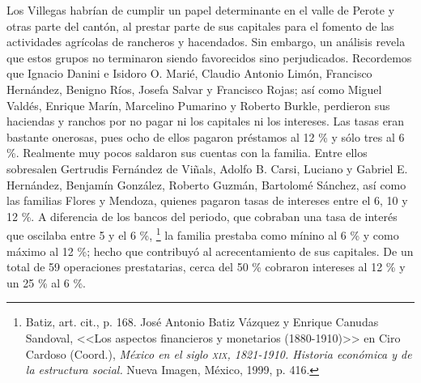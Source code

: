 \documentclass[14pt,twoside,final]{extbook} %
\let\oldfootnote\footnote
\renewcommand\footnote[1]{%
\oldfootnote{\hspace{1mm}#1}}
\begin{document}
Los Villegas habrían de cumplir un papel determinante en el valle de Perote y otras parte del cantón, al prestar parte de sus capitales para el fomento de las actividades agrícolas de rancheros y hacendados. Sin embargo, un análisis revela que estos grupos no terminaron siendo favorecidos sino perjudicados. Recordemos que Ignacio Danini e Isidoro O. Marié, Claudio Antonio Limón, Francisco Hernández, Benigno Ríos, Josefa Salvar y Francisco Rojas; así como Miguel Valdés, Enrique Marín, Marcelino Pumarino y Roberto Burkle, perdieron sus haciendas y ranchos por no pagar ni los capitales ni los intereses. Las tasas eran bastante onerosas, pues ocho de ellos pagaron préstamos al 12 \% y sólo tres al 6 \%. Realmente muy pocos saldaron sus cuentas con la familia. Entre ellos sobresalen Gertrudis Fernández de Viñals, Adolfo B. Carsi, Luciano y Gabriel E. Hernández, Benjamín González, Roberto Guzmán, Bartolomé Sánchez, así como las familias Flores y Mendoza, quienes pagaron tasas de
intereses entre el 6, 10 y 12 \%. A diferencia de los bancos del periodo, que cobraban una tasa de interés que oscilaba entre 5 y el 6 \%,\footnote{Batiz, art. cit., p. 168. José Antonio Batiz Vázquez y Enrique Canudas Sandoval, <<Los aspectos financieros y monetarios (1880-1910)>> en Ciro Cardoso (Coord.), \emph{México en el siglo \textsc{xix}, 1821-1910. Historia económica y de la estructura social.} Nueva Imagen, México, 1999, p. 416.} la familia prestaba como mínino al 6 \% y como máximo al 12 \%; hecho que contribuyó al acrecentamiento de sus capitales. De un total de 59 operaciones prestatarias, cerca del 50 \% cobraron intereses al 12 \% y un 25 \% al 6 \%.
\end{document}
